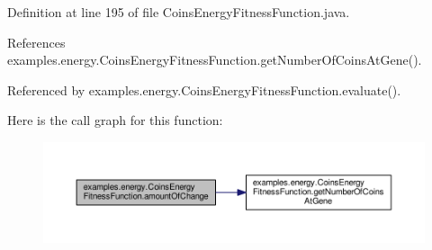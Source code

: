 Definition at line 195 of file Coins\-Energy\-Fitness\-Function.\-java.



References examples.\-energy.\-Coins\-Energy\-Fitness\-Function.\-get\-Number\-Of\-Coins\-At\-Gene().



Referenced by examples.\-energy.\-Coins\-Energy\-Fitness\-Function.\-evaluate().



Here is the call graph for this function\-:
\nopagebreak
\begin{figure}[H]
\begin{center}
\leavevmode
\includegraphics[width=350pt]{classexamples_1_1energy_1_1_coins_energy_fitness_function_a39b14edc81ee46d55ba8eb8e4b49343a_cgraph}
\end{center}
\end{figure}


